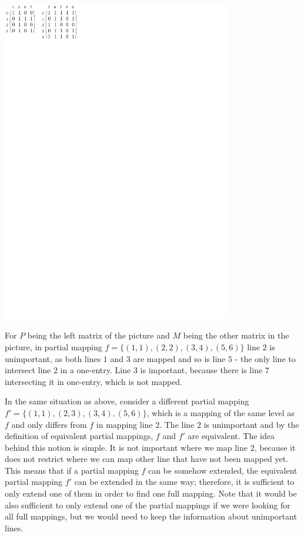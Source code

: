 \centerline{\mbox{\includegraphics[width=100mm]{../img/equivalent.pdf}}}
For $P$ being the left matrix of the picture and $M$ being the other matrix in the picture, in partial mapping $f=\{(1,1),(2,2),(3,4),(5,6)\}$ line $2$ is unimportant, as both lines $1$ and $3$ are mapped and so is line $5$ - the only line to intersect line $2$ in a one-entry. Line $3$ is important, because there is line $7$ intersecting it in one-entry, which is not mapped.

In the same situation as above, consider a different partial mapping $f'=\{(1,1),(2,3),(3,4),(5,6)\}$, which is a mapping of the same level as $f$ and only differs from $f$ in mapping line $2$. The line $2$ is unimportant and by the definition of equivalent partial mappings, $f$ and $f'$ are equivalent. The idea behind this notion is simple. It is not important where we map line $2$, because it does not restrict where we can map other line that have not been mapped yet. This means that if a partial mapping $f$ can be somehow extended, the equivalent partial mapping $f'$ can be extended in the same way; therefore, it is sufficient to only extend one of them in order to find one full mapping. Note that it would be also sufficient to only extend one of the partial mappings if we were looking for all full mappings, but we would need to keep the information about unimportant lines.